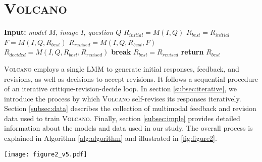\documentclass[11pt]{article}
\newcommand{\Ours}{\textsc{Volcano}}
\begin{document}
\section{{\Ours}}
\label{sec:volcano}
\begin{algorithm}[t]
\caption{Feedback guided self-revision}
\begin{algorithmic}[1]
\State \textbf{Input:} \textit{model $M$}, \textit{image $I$}, \textit{question $Q$}
\State \textit{$R_{initial} = M(I, Q)$}
\State \textit{$R_{best} = R_{initial}$}
    \State \textit{$F = M(I, Q, R_{best})$} \hspace{0.3cm}
    \State \textit{$R_{revised} = M(I, Q, R_{best}, F)$} \hspace{0.3cm}
    \State \textit{$R_{decided} = M(I, Q, R_{best}, R_{revised})$} \hspace{0.3cm}
        \State \textbf{break}
    \Else
        \State \textit{$R_{best} = R_{revised}$}
    \EndIf
\EndFor
\State \textbf{return} \textit{$R_{best}$}
\end{algorithmic}
\label{alg:algorithm}
\end{algorithm}
{\Ours} employs a single LMM to generate initial responses, feedback, and revisions, as well as decisions to accept revisions. It follows a sequential procedure of an iterative critique-revision-decide loop. In section \ref{subsec:iterative}, we introduce the process by which {\Ours} self-revises its responses iteratively. Section \ref{subsec:data} describes the collection of multimodal feedback and revision data used to train {\Ours}. Finally, section \ref{subsec:imple} provides detailed information about the models and data used in our study. The overall process is explained in Algorithm \autoref{alg:algorithm} and illustrated in \autoref{fig:figure2}.
\begin{figure*}[ht]
\texttt{[image: figure2\_v5.pdf]}
\caption{\textbf{Overall process of {\Ours}.} {\Ours} is a multimodal self-feedback guided revision model that takes an image and a question and then generates an improved response based on the self-feedback.}
\label{fig:figure2}
\end{figure*}
\end{document}
